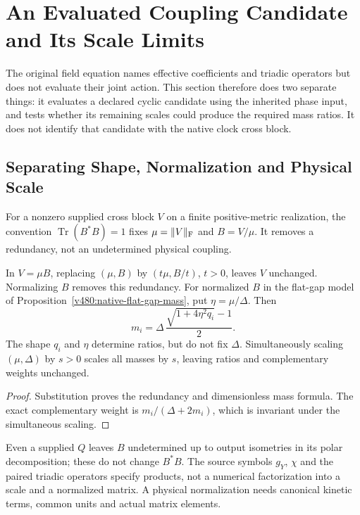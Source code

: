 \section{An Evaluated Coupling Candidate and Its Scale Limits}
\label{v480:coupling-scale-candidate}

The original field equation names effective coefficients and triadic
operators but does not evaluate their joint action. This section
therefore does two separate things: it evaluates a declared cyclic
candidate using the inherited phase input, and tests whether its
remaining scales could produce the required mass ratios. It does
not identify that candidate with the native clock cross block.

\subsection{Separating Shape, Normalization and Physical Scale}
\label{v480:coupling-normalization}

For a nonzero supplied cross block $V$ on a finite positive-metric
realization, the convention $\operatorname{Tr}(B^*B)=1$ fixes
$\mu=\|V\|_{\rm F}$ and $B=V/\mu$. It removes a redundancy,
not an undetermined physical coupling.

\begin{proposition}
\label{v480:coupling-scale-freedom}
In $V=\mu B$, replacing $(\mu,B)$ by $(t\mu,B/t)$, $t>0$,
leaves $V$ unchanged. Normalizing $B$ removes this redundancy.
For normalized $B$ in the flat-gap model of
Proposition~\ref{v480:native-flat-gap-mass}, put
$\eta=\mu/\Delta$. Then
\[
 m_i=\Delta\,\frac{\sqrt{1+4\eta^2q_i}-1}{2}.
\]
The shape $q_i$ and $\eta$ determine ratios, but do not fix
$\Delta$. Simultaneously scaling $(\mu,\Delta)$ by $s>0$
scales all masses by $s$, leaving ratios and complementary weights
unchanged.
\end{proposition}
\begin{proof}
Substitution proves the redundancy and dimensionless mass formula.
The exact complementary weight is $m_i/(\Delta+2m_i)$, which
is invariant under the simultaneous scaling.
\end{proof}

Even a supplied $Q$ leaves $B$ undetermined up to output isometries
in its polar decomposition; these do not change $B^*B$.
The source symbols $g_Y$, $\chi$ and the paired triadic operators
specify products, not a numerical factorization into a scale and a
normalized matrix. A physical normalization needs canonical kinetic
terms, common units and actual matrix elements.

